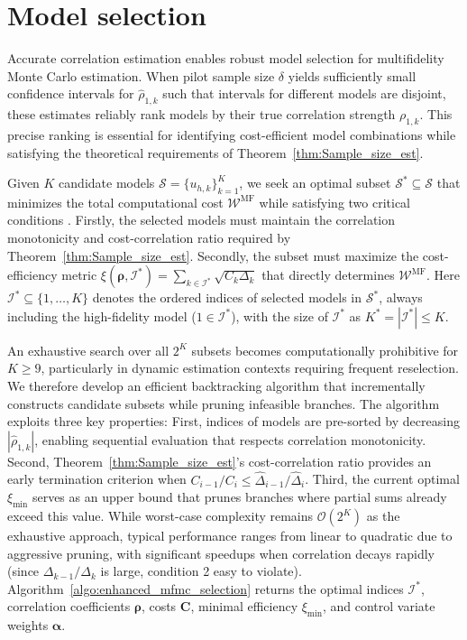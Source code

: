 \section{Model selection}\label{sec:Model_Selection}
Accurate correlation estimation enables robust model selection for multifidelity Monte Carlo estimation. When pilot sample size $\delta$ yields sufficiently small confidence intervals for $\widehat\rho_{1,k}$ such that intervals for different models are disjoint, these estimates reliably rank models by their true correlation strength $\rho_{1,k}$. This precise ranking is essential for identifying cost-efficient model combinations while satisfying the theoretical requirements of Theorem~\ref{thm:Sample_size_est}.


Given $K$ candidate models $\mathcal{S} = \{ u_{h,k} \}_{k=1}^K$, we seek an optimal subset $\mathcal{S}^* \subseteq \mathcal{S}$ that minimizes the total computational cost $\mathcal{W}^{\text{MF}}$ while satisfying two critical conditions \cite{PeWiGu:2016}. Firstly, the selected models must maintain the correlation monotonicity and cost-correlation ratio required by Theorem~\ref{thm:Sample_size_est}. Secondly, the subset must maximize the cost-efficiency metric $\xi(\boldsymbol{\rho},\mathcal{I}^*) = \sum_{k \in \mathcal{I}^*} \sqrt{C_k \Delta_k}$ that directly determines $\mathcal{W}^{\text{MF}}$. Here $\mathcal{I}^* \subseteq \{1,\ldots,K\}$ denotes the ordered indices of selected models in $\mathcal{S}^*$, always including the high-fidelity model ($1 \in \mathcal{I}^*$), with the size of $\mathcal{I}^*$ as $K^* = |\mathcal{I}^*| \leq K$.


An exhaustive search \cite{PeWiGu:2016} over all $2^K$ subsets becomes computationally prohibitive for $K \geq 9$, particularly in dynamic estimation contexts requiring frequent reselection. We therefore develop an efficient backtracking algorithm that incrementally constructs candidate subsets while pruning infeasible branches. The algorithm exploits three key properties: First, indices of models are pre-sorted by decreasing $|\widehat\rho_{1,k}|$, enabling sequential evaluation that respects correlation monotonicity. Second, Theorem~\ref{thm:Sample_size_est}'s cost-correlation ratio provides an early termination criterion when $C_{i-1}/C_i \leq \widehat\Delta_{i-1}/\widehat\Delta_i$. Third, the current optimal $\xi_{\text{min}}$ serves as an upper bound that prunes branches where partial sums already exceed this value. While worst-case complexity remains $\mathcal{O}(2^K)$ as the exhaustive approach, typical performance ranges from linear to quadratic due to aggressive pruning, with significant speedups when correlation decays rapidly (since $\Delta_{k-1}/\Delta_{k}$ is large, condition 2 easy to violate). Algorithm~\ref{algo:enhanced_mfmc_selection} returns the optimal indices $\mathcal{I}^*$, correlation coefficients $\boldsymbol{\rho}$, costs $\boldsymbol{C}$, minimal efficiency $\xi_{\text{min}}$, and control variate weights $\boldsymbol{\alpha}$.

